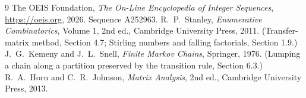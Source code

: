 \documentclass[11pt,a4paper]{article}
\theoremstyle{plain}
\theoremstyle{definition}
\begin{document}
\begin{thebibliography}{9}
 The OEIS Foundation, \emph{The On-Line Encyclopedia of Integer
Sequences}, \url{https://oeis.org}, 2026. Sequence A252963.
 R.~P.~Stanley, \emph{Enumerative Combinatorics}, Volume 1, 2nd ed.,
Cambridge University Press, 2011. (Transfer-matrix method, Section 4.7; Stirling numbers and
falling factorials, Section 1.9.)
 J.~G.~Kemeny and J.~L.~Snell, \emph{Finite Markov Chains}, Springer,
1976. (Lumping a chain along a partition preserved by the transition rule, Section 6.3.)
 R.~A.~Horn and C.~R.~Johnson, \emph{Matrix Analysis}, 2nd ed., Cambridge
University Press, 2013.
\end{thebibliography}
\end{document}
